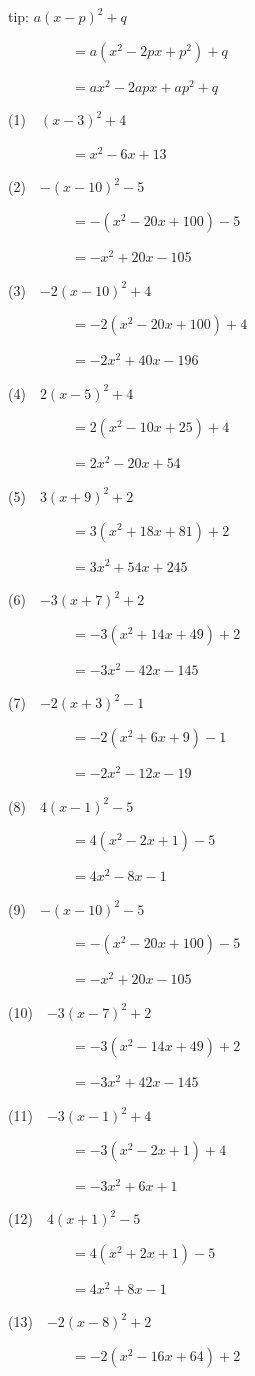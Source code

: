 \documentclass[a4j,twocolumn,10pt,fleqn]{jarticle}
\begin{document}
tip: $a(x - p)^2 + q$

~~~~~~~~~$= a(x^2 - 2px + p^2) + q$

~~~~~~~~~$= ax^2 - 2apx + ap^2 + q$

(1)~~$(x-3)^2 +4$

~~~~~~~~~$=x^2-6x +13$

(2)~~$-(x-10)^2-5$

~~~~~~~~~$=-(x^2-20x +100)-5$

~~~~~~~~~$=-x^2 +20x-105$

(3)~~$-2(x-10)^2 +4$

~~~~~~~~~$=-2(x^2-20x +100) +4$

~~~~~~~~~$=-2x^2 +40x-196$

(4)~~$2(x-5)^2 +4$

~~~~~~~~~$=2(x^2-10x +25) +4$

~~~~~~~~~$=2x^2-20x +54$

(5)~~$3(x +9)^2 +2$

~~~~~~~~~$=3(x^2 +18x +81) +2$

~~~~~~~~~$=3x^2 +54x +245$

(6)~~$-3(x +7)^2 +2$

~~~~~~~~~$=-3(x^2 +14x +49) +2$

~~~~~~~~~$=-3x^2-42x-145$

(7)~~$-2(x +3)^2-1$

~~~~~~~~~$=-2(x^2 +6x +9)-1$

~~~~~~~~~$=-2x^2-12x-19$

(8)~~$4(x-1)^2-5$

~~~~~~~~~$=4(x^2-2x +1)-5$

~~~~~~~~~$=4x^2-8x-1$

(9)~~$-(x-10)^2-5$

~~~~~~~~~$=-(x^2-20x +100)-5$

~~~~~~~~~$=-x^2 +20x-105$

(10)~~$-3(x-7)^2 +2$

~~~~~~~~~$=-3(x^2-14x +49) +2$

~~~~~~~~~$=-3x^2 +42x-145$

(11)~~$-3(x-1)^2 +4$

~~~~~~~~~$=-3(x^2-2x +1) +4$

~~~~~~~~~$=-3x^2 +6x +1$

(12)~~$4(x +1)^2-5$

~~~~~~~~~$=4(x^2 +2x +1)-5$

~~~~~~~~~$=4x^2 +8x-1$

(13)~~$-2(x-8)^2 +2$

~~~~~~~~~$=-2(x^2-16x +64) +2$
\end{document}
